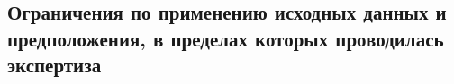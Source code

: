 	\subsection{Ограничения по применению исходных данных и предположения, в пределах которых проводилась экспертиза}
	
	
	
	
 

